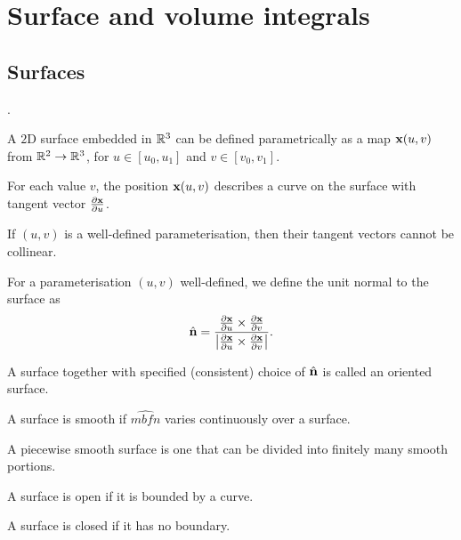 \documentclass[10pt, a4paper]{article}
\begin{document}
\newpage

\section{Surface and volume integrals}

\subsection{Surfaces}.

A $2$D surface embedded in $\mathbb{R} ^ 3$ can be defined parametrically as a map $\mathbf{x}(u, v)$ from $\mathbb{R} ^ 2 \to \mathbb{R} ^ 3$,
for $u \in [u_0, u_1]$ and $v \in [v_0, v_1]$.

For each value $v$,
the position $\mathbf{x}(u, v)$ describes a curve on the surface with tangent vector $\frac{\partial \mathbf{x}}{\partial u}$.

If $(u, v)$ is a well-defined parameterisation,
then their tangent vectors cannot be collinear.

\begin{definition}
    For a parameterisation $(u, v)$ well-defined,
    we define the unit normal to the surface as
    \[
    \hat{\mathbf{n}} = \frac{\frac{\partial\mathbf{x}}{\partial u} \times \frac{\partial \mathbf{x}}{\partial v}}{\left|\frac{\partial\mathbf{x}}{\partial u} \times \frac{\partial \mathbf{x}}{\partial v}\right|}.
    \]

    A surface together with specified
    (consistent)
    choice of $\hat{\mathbf{n}}$ is called an oriented surface.
\end{definition}

\begin{definition}
    A surface is smooth if $\hat{mbf{n}}$ varies continuously over a surface.
\end{definition}

\begin{definition}
    A piecewise smooth surface is one that can be divided into finitely many smooth portions.
\end{definition}

\begin{definition}
    A surface is open if it is bounded by a curve.
\end{definition}

\begin{definition}
    A surface is closed if it has no boundary.
\end{definition}
\end{document}
